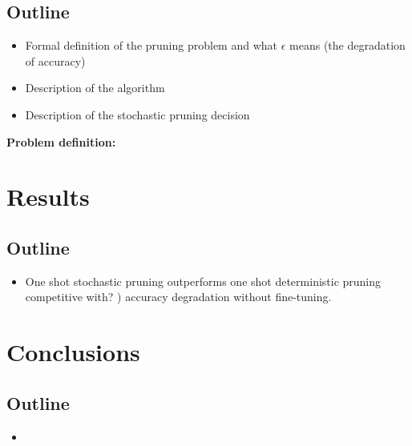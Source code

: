 \documentclass[nohyperref]{article}
\theoremstyle{plain}
\theoremstyle{definition}
\theoremstyle{remark}
\begin{document}
\subsection{Outline}
\begin{itemize}
\item Formal definition of the pruning problem and  what $\epsilon$ means (the degradation of accuracy)
\item Description of the algorithm

    \item Description of the stochastic pruning decision
\end{itemize}
\textbf{Problem definition:}


\section{Results}
\subsection{Outline}
\begin{itemize}
    \item One shot stochastic pruning outperforms one shot deterministic
        pruning
        competitive with? ) accuracy degradation without fine-tuning.
\end{itemize}



\section{Conclusions}
\subsection{Outline}
\begin{itemize}
    \item 
\end{itemize}








\newpage
\appendix
\onecolumn

\end{document}
